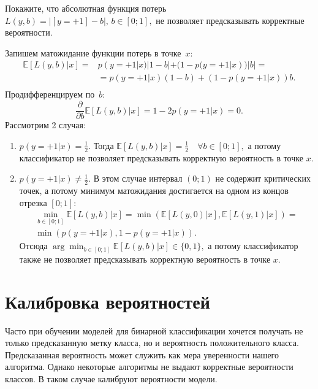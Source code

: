 \documentclass[12pt,a4paper]{article}
\begin{document}
\begin{vkProblem} Покажите, что абсолютная функция потерь~$L(y, b) = |[y = +1] - b|, \, b \in [0; 1],$
	не позволяет предсказывать корректные вероятности.
\end{vkProblem}
\begin{esSolution}
	Запишем матожидание функции потерь в точке~$x$:
	\begin{align*}
		\mathbb{E} \left[ L(y, b)|x\right] = &p(y=+1|x)|1-b| + (1 - p(y=+1|x))|b| = \\
		&= p(y=+1|x)(1-b)+ (1 - p(y=+1|x))b.\\
	\end{align*}
	Продифференцируем по~$b$:
	$$\frac{\partial}{\partial b}
	\mathbb{E} \left[
	L(y, b)
	|
	x
	\right] =
	1 - 2 p(y = +1 | x) = 0.$$
	Рассмотрим 2 случая:
	\begin{enumerate}
		\item $p(y=+1|x) = \frac{1}{2}.$ Тогда $\mathbb{E} \left[ L(y, b)|x\right] = \frac{1}{2} \quad \forall b \in [0; 1],$ а потому классификатор не позволяет предсказывать корректную вероятность в точке $x$.
		\item $p(y=+1|x) \ne \frac{1}{2}.$ В этом случае интервал $(0; 1)$ не содержит критических точек, а потому минимум матожидания достигается на одном из концов отрезка $[0; 1]:$
		\begin{align*}
			\min_{b \in [0;1]} \mathbb{E} \left[ L(y, b)|x\right] = 
			\min \left(\mathbb{E} \left[ L(y, 0)|x\right], \mathbb{E} \left[ L(y, 1)|x\right] \right) =\\
			\min \left(p(y = +1 | x), 1 - p(y = +1 | x)\right).
		\end{align*}
		Отсюда $\arg \min_{b \in [0;1]} \mathbb{E} \left[ L(y, b)|x\right] \in \{0, 1\},$ а потому классификатор также не позволяет предсказывать корректную вероятность в точке $x$.
	\end{enumerate}
\end{esSolution}

\section{Калибровка вероятностей}

Часто при обучении моделей для бинарной классификации хочется получать не только предсказанную метку класса, но и вероятность положительного класса. Предсказанная вероятность может служить как мера уверенности нашего алгоритма. Однако некоторые алгоритмы не выдают корректные вероятности классов. В таком случае калибруют вероятности модели.
\end{document}
